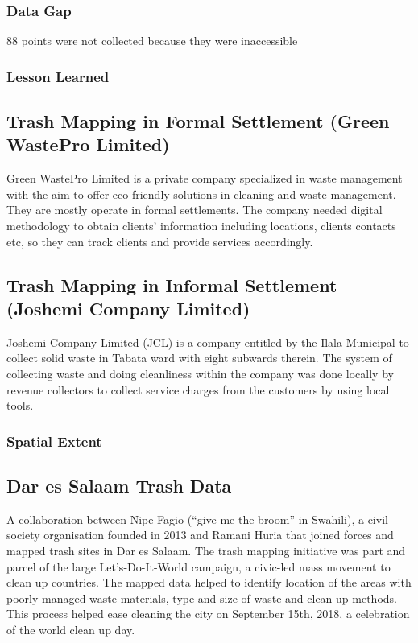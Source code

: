 \documentclass[a4paper,12pt,twoside]{article}
\begin{document}
\subsubsection{Data Gap}
88 points were not collected because they were inaccessible

\subsubsection{Lesson Learned}

\newpage
\subsection{Trash Mapping in Formal Settlement (Green WastePro Limited)}
Green WastePro Limited is a private company specialized in waste management with the aim to offer eco-friendly solutions in cleaning and waste management. They are mostly operate in formal settlements. The company needed digital methodology to obtain clients’ information including locations, clients contacts etc, so they can track clients and provide services accordingly.

\newpage
\subsection{Trash Mapping in Informal Settlement (Joshemi Company Limited)}

Joshemi Company Limited (JCL) is a company entitled by the Ilala Municipal to collect solid waste in Tabata ward with eight subwards therein. The system of collecting waste and doing cleanliness within the company was done locally by revenue collectors to collect service charges from the customers by using local tools.
\subsubsection {Spatial Extent}

\newpage
\subsection{Dar es Salaam Trash Data}

A collaboration between Nipe Fagio (“give me the broom” in Swahili), a civil society organisation founded in 2013 and Ramani Huria that joined forces and mapped trash sites in Dar es Salaam. The trash mapping initiative was part and parcel of the large Let’s-Do-It-World campaign, a civic-led mass movement to clean up countries.
The mapped data helped to identify location of the areas with poorly managed waste materials, type and size of waste and clean up methods. This process helped ease cleaning the city on September 15th, 2018, a celebration of the world clean up day.
\end{document}
